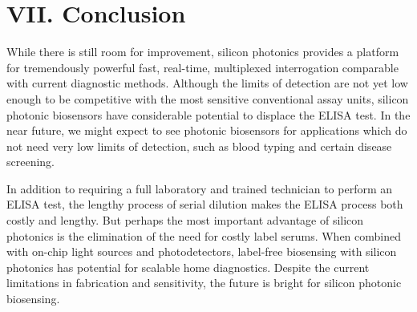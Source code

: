 \documentclass[aps,prl,twocolumn, superscriptaddress,nobalancelastpage]{revtex4}
\begin{document}
\section{VII. Conclusion}
\vspace{-1em}

While there is still room for improvement, silicon photonics provides a platform for tremendously powerful fast, real-time, multiplexed interrogation comparable with current diagnostic methods. Although the limits of detection are not yet low enough to be competitive with the most sensitive conventional assay units, silicon photonic biosensors have considerable potential to displace the ELISA test. In the near future, we might expect to see photonic biosensors for applications which do not need very low limits of detection, such as blood typing and certain disease screening. 

In addition to requiring a full laboratory and trained technician to perform an ELISA test, the lengthy process of serial dilution makes the ELISA process both costly and lengthy. But perhaps the most important advantage of silicon photonics is the elimination of the need for costly label serums. When combined with on-chip light sources and photodetectors, label-free biosensing with silicon photonics has potential for scalable home diagnostics. Despite the current limitations in fabrication and sensitivity, the future is bright for silicon photonic biosensing.


\end{document}
